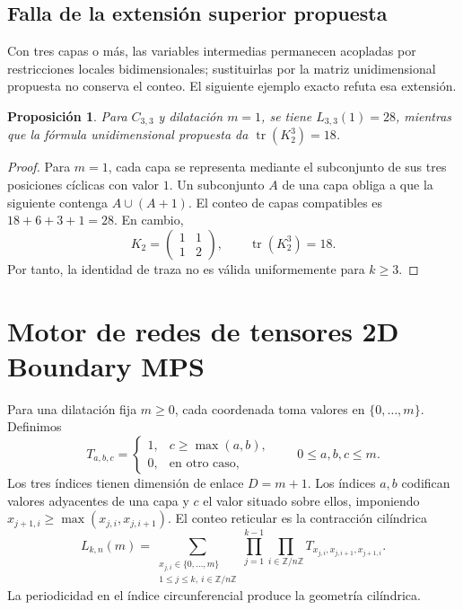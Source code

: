 \documentclass[11pt,a4paper]{article}
\newtheorem{proposition}[theorem]{Proposición}
\theoremstyle{definition}
\begin{document}
\subsection{Falla de la extensión superior propuesta}

Con tres capas o más, las variables intermedias permanecen acopladas por restricciones locales bidimensionales; sustituirlas por la matriz unidimensional propuesta no conserva el conteo. El siguiente ejemplo exacto refuta esa extensión.

\begin{proposition}\label{prop:contraejemplo}
Para $C_{3,3}$ y dilatación $m=1$, se tiene $L_{3,3}(1)=28$, mientras que la fórmula unidimensional propuesta da $\operatorname{tr}(K_2^3)=18$.
\end{proposition}

\begin{proof}
Para $m=1$, cada capa se representa mediante el subconjunto de sus tres posiciones cíclicas con valor $1$. Un subconjunto $A$ de una capa obliga a que la siguiente contenga $A\cup(A+1)$. El conteo de capas compatibles es $18+6+3+1=28$. En cambio,
\[
K_2=\begin{pmatrix}1&1\\1&2\end{pmatrix},
\qquad \operatorname{tr}(K_2^3)=18.
\]
Por tanto, la identidad de traza no es válida uniformemente para $k\ge3$.
\end{proof}

\section{Motor de redes de tensores 2D Boundary MPS}

Para una dilatación fija $m\ge0$, cada coordenada toma valores en $\{0,\ldots,m\}$. Definimos
\[
T_{a,b,c}=
\begin{cases}
1,&c\ge\max(a,b),\\
0,&\text{en otro caso},
\end{cases}
\qquad 0\le a,b,c\le m.
\]
Los tres índices tienen dimensión de enlace $D=m+1$. Los índices $a,b$ codifican valores adyacentes de una capa y $c$ el valor situado sobre ellos, imponiendo $x_{j+1,i}\ge\max(x_{j,i},x_{j,i+1})$. El conteo reticular es la contracción cilíndrica
\[
L_{k,n}(m)=
\sum_{\substack{x_{j,i}\in\{0,\ldots,m\}\\1\le j\le k,\ i\in\mathbb Z/n\mathbb Z}}
\prod_{j=1}^{k-1}\prod_{i\in\mathbb Z/n\mathbb Z}
T_{x_{j,i},x_{j,i+1},x_{j+1,i}}.
\]
La periodicidad en el índice circunferencial produce la geometría cilíndrica.
\end{document}
